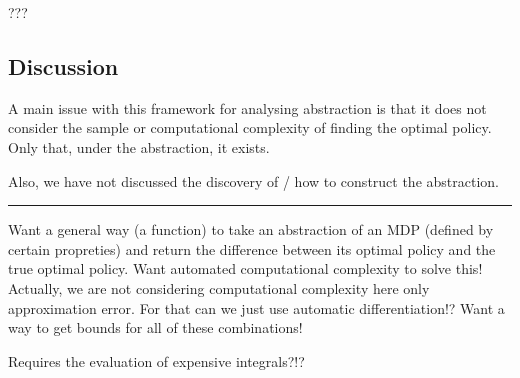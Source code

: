 ???


\subsection{Discussion}

A main issue with this framework for analysing abstraction is that it does not consider
the sample or computational complexity of finding the optimal policy. Only that, under the abstraction,
it exists.

Also, we have not discussed the discovery of / how to construct the abstraction.

\begin{center}\rule{0.5\linewidth}{\linethickness}\end{center}

Want a general way (a function) to take an abstraction of an MDP
(defined by certain propreties) and return the difference between its
optimal policy and the true optimal policy. Want automated computational
complexity to solve this! Actually, we are not considering computational
complexity here only approximation error. For that can we just use
automatic differentiation!? Want a way to get bounds for all of these
combinations!

Requires the evaluation of expensive integrals?!?
